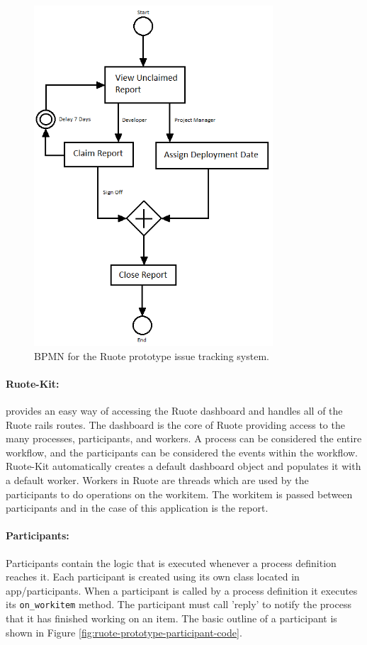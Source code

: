 \documentclass[document.tex]{subfiles}
\begin{document}
\begin{figure}[!ht]
\centering \includegraphics[height=5in]{./img/prototypes/ruote-bpmn-diagram}
\caption{BPMN for the Ruote prototype issue tracking system.}
\label{fig:ruote-bpmn-diagram}
\end{figure}

\paragraph{Ruote-Kit:} provides an easy way of accessing the Ruote dashboard and handles all of the Ruote rails routes. The dashboard is the core of Ruote providing access to the many processes, participants, and workers. A process can be considered the entire workflow, and the participants can be considered the events within the workflow. Ruote-Kit automatically creates a default dashboard object and populates it with a default worker. Workers in Ruote are threads which are used by the participants to do operations on the workitem. The workitem is passed between participants and in the case of this application is the report.

\paragraph{Participants:} Participants contain the logic that is executed whenever a process definition reaches it. Each participant is created using its own class located in app\slash participants. When a participant is called by a process definition it executes its \verb!on_workitem! method. The participant must call 'reply' to notify the process that it has finished working on an item. The basic outline of a participant is shown in Figure \ref{fig:ruote-prototype-participant-code}.
\end{document}
